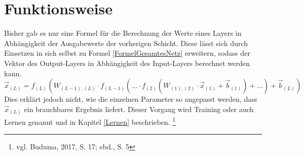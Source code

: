 \documentclass[a4paper,12pt,ngerman,oneside]{scrreprt}	%
\newcommand{\fundamentals}[1]{vgl. Buduma, 2017, S. {#1}}
\begin{document}
		
		\section{Funktionsweise}
		Bisher gab es nur eine Formel für die Berechnung der Werte eines Layers in Abhängigkeit der Ausgabewerte der vorherigen Schicht. Diese lässt sich durch Einsetzen in sich selbst zu Formel \ref{FormelGesamtesNetz} erweitern, sodass der Vektor des Output-Layers in Abhängigkeit des Input-Layers berechnet werden kann. 
			\begin{equation}\label{FormelGesamtesNetz}
				\vec{x}_{(L)} = f_{(L)} \left( W_{(L-1),(L)} \cdot f_{(L-1)} \left(…\cdot f_{(2)} \left(W_{(1),(2)}\cdot\vec{x}_{(1)}+\vec{b}_{(1)}\right)+…\right)+\vec{b}_{(L)}\right)
			\end{equation}
		Dies erklärt jedoch nicht, wie die einzelnen Parameter so angepasst werden, dass $\vec{x}_{(L)}$ ein brauchbares Ergebnis liefert. Dieser Vorgang wird Training oder auch Lernen genannt und in Kapitel \ref{Lernen} beschrieben. \footnote{\fundamentals{17; ebd., S. 5}}
	
\end{document}
